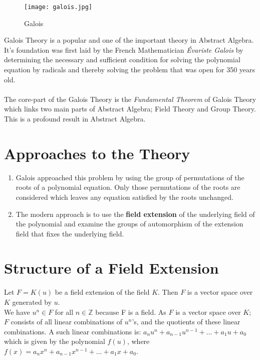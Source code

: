 \begin{wrapfigure}{r}{0.27\textwidth}
  \texttt{[image: galois.jpg]}
  \caption{Galois}
\end{wrapfigure}

Galois Theory is a popular and one of the important theory in Abstract Algebra. It's foundation was first laid by the French Mathematician \textit{Évariste Galois} by determining the necessary and sufficient condition for solving the polynomial equation by radicals and thereby solving the problem that was open for 350 years old.\\ \\
The core-part of the Galois Theory is the \textit{Fundamental Theorem} of Galois Theory which links two main parts of Abstract Algebra; Field Theory and Group Theory. This is a profound result in Abstract Algebra. \\

\section{Approaches to the Theory}
\begin{enumerate}
\item Galois approached this problem by using the group of permutations of the roots of a polynomial equation. Only those permutations of the roots are considered which leaves any equation satisfied by the roots unchanged.

\item The modern approach is to use the \textbf{field extension} of the underlying field of the polynomial and examine the groups of automorphism of the extension field that fixes the underlying field.
\end{enumerate}
\clearpage

\section{Structure of a Field Extension}
Let \(F=K(u)\) be a field extension of the field \(K\). Then \(F\) is a vector space over \(K\) generated by \(u\).\\
We have \(u^n \in F\) for all \(n \in \mathbb{Z}\) because F is a field. As \(F\) is a vector space over \(K\); \(F\) consists of all linear combinations of \(u^n \)'s, and the quotients of these linear combinations. A such linear combinations is: \(a_nu^n+a_{n-1}u^{n-1}+...+a_1u+a_0\) which is  given by the polynomial \(f(u)\), where \(f(x)=a_nx^n+a_{n-1}x^{n-1}+...+a_1x+a_0\).\\

